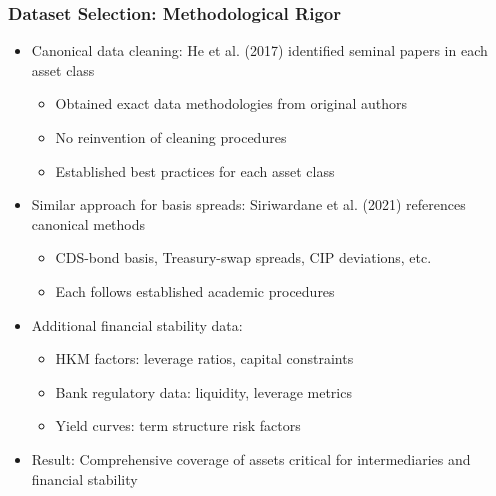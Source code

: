 \documentclass[ignorenonframetext, 9pt]{beamer}
\begin{document}
\begin{frame}
  \frametitle{Dataset Selection: Methodological Rigor}
  \begin{itemize}
  \item \alert{Canonical data cleaning:} He et al. (2017) identified seminal papers in each asset class
  \begin{itemize}
    \item Obtained exact data methodologies from original authors
    \item No reinvention of cleaning procedures
    \item Established best practices for each asset class
  \end{itemize}
  \vspace{0.3cm}
  \item \alert{Similar approach for basis spreads:} Siriwardane et al. (2021) references canonical methods
  \begin{itemize}
    \item CDS-bond basis, Treasury-swap spreads, CIP deviations, etc.
    \item Each follows established academic procedures
  \end{itemize}
  \vspace{0.3cm}
  \item \alert{Additional financial stability data:}
  \begin{itemize}
    \item HKM factors: leverage ratios, capital constraints
    \item Bank regulatory data: liquidity, leverage metrics
    \item Yield curves: term structure risk factors
  \end{itemize}
  \vspace{0.3cm}
  \item \alert{Result:} Comprehensive coverage of assets critical for intermediaries and financial stability
  \end{itemize}
\end{frame}

\begin{frame}[plain]
  \centering
  \vspace{0.2cm}
  \scalebox{0.9}{%
  }
\end{frame}
\end{document}

